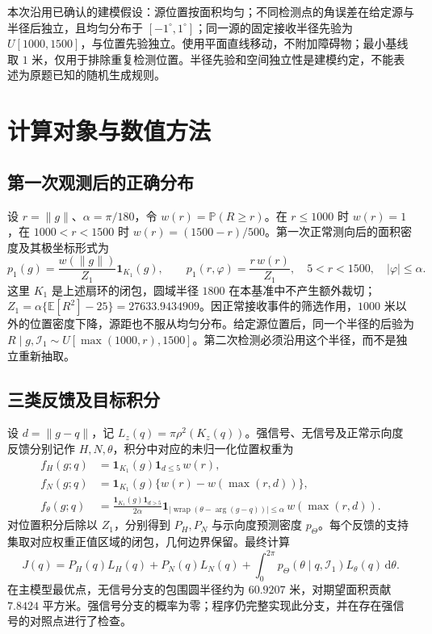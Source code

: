 \documentclass[UTF8,a4paper,zihao=5,fontset=none]{ctexart}
\newcommand{\E}{\mathbb E}\newcommand{\Prob}{\mathbb P}
\begin{document}
本次沿用已确认的建模假设：源位置按面积均匀；不同检测点的角误差在给定源与半径后独立，且均匀分布于 \([-1^\circ,1^\circ]\)；同一源的固定接收半径先验为 \(U[1000,1500]\)，与位置先验独立。使用平面直线移动，不附加障碍物；最小基线取 \(1\) 米，仅用于排除重复检测位置。半径先验和空间独立性是建模约定，不能表述为原题已知的随机生成规则。

\newpage
\section{计算对象与数值方法}
\subsection{第一次观测后的正确分布}
设 \(r=\|g\|\)、\(\alpha=\pi/180\)，令 \(w(r)=\Prob(R\ge r)\)。在 \(r\le1000\) 时 \(w(r)=1\)，在 \(1000<r<1500\) 时 \(w(r)=(1500-r)/500\)。第一次正常测向后的面积密度及其极坐标形式为
\[
 p_1(g)=\frac{w(\|g\|)}{Z_1}\mathbf1_{K_1}(g),\qquad
 p_1(r,\varphi)=\frac{r\,w(r)}{Z_1},\quad
 5<r<1500,\quad |\varphi|\le\alpha.
\]
这里 \(K_1\) 是上述扇环的闭包，圆域半径 \(1800\) 在本基准中不产生额外裁切；\(Z_1=\alpha\{\E[R^2]-25\}=27633.9434909\)。因正常接收事件的筛选作用，\(1000\) 米以外的位置密度下降，源距也不服从均匀分布。给定源位置后，同一个半径的后验为 \(R\mid g,\mathcal I_1\sim U[\max(1000,r),1500]\)。第二次检测必须沿用这个半径，而不是独立重新抽取。

\subsection{三类反馈及目标积分}
设 \(d=\|g-q\|\)，记 \(L_z(q)=\pi\rho^2(K_z(q))\)。强信号、无信号及正常示向度反馈分别记作 \(H,N,\theta\)，积分中对应的未归一化位置权重为
\[
\begin{aligned}
 f_H(g;q)&=\mathbf1_{K_1}(g)\mathbf1_{d\le5}\,w(r),\\
 f_N(g;q)&=\mathbf1_{K_1}(g)\{w(r)-w(\max(r,d))\},\\
 f_\theta(g;q)&=\frac{\mathbf1_{K_1}(g)\mathbf1_{d>5}}{2\alpha}
 \mathbf1_{|\operatorname{wrap}(\theta-\arg(g-q))|\le\alpha}\,w(\max(r,d)).
\end{aligned}
\]
对位置积分后除以 \(Z_1\)，分别得到 \(P_H,P_N\) 与示向度预测密度 \(p_\Theta\)。每个反馈的支持集取对应权重正值区域的闭包，几何边界保留。最终计算
\[
 J(q)=P_H(q)L_H(q)+P_N(q)L_N(q)
       +\int_0^{2\pi}p_\Theta(\theta\mid q,\mathcal I_1)L_\theta(q)\,\mathrm d\theta.
\]
在主模型最优点，无信号分支的包围圆半径约为 \(60.9207\) 米，对期望面积贡献 \(7.8424\) 平方米。强信号分支的概率为零；程序仍完整实现此分支，并在存在强信号的对照点进行了检查。
\end{document}
